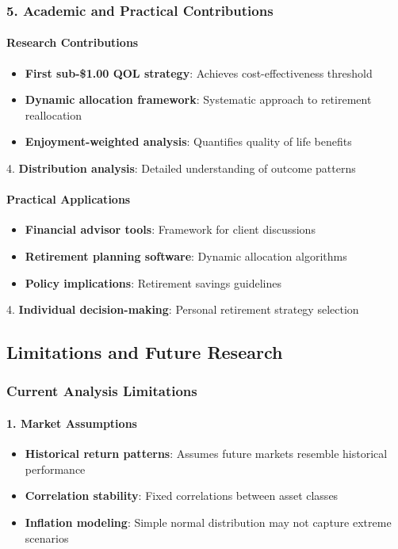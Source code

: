 \documentclass[11pt,letterpaper]{article}
\begin{document}
\subsubsection{5. Academic and Practical Contributions}

\paragraph{Research Contributions}
\begin{itemize}
\item \textbf{First sub-\$1.00 QOL strategy}: Achieves cost-effectiveness threshold
\item \textbf{Dynamic allocation framework}: Systematic approach to retirement reallocation
\item \textbf{Enjoyment-weighted analysis}: Quantifies quality of life benefits
\end{itemize}
4. \textbf{Distribution analysis}: Detailed understanding of outcome patterns


\paragraph{Practical Applications}
\begin{itemize}
\item \textbf{Financial advisor tools}: Framework for client discussions
\item \textbf{Retirement planning software}: Dynamic allocation algorithms
\item \textbf{Policy implications}: Retirement savings guidelines
\end{itemize}
4. \textbf{Individual decision-making}: Personal retirement strategy selection




\subsection{Limitations and Future Research}

\subsubsection{Current Analysis Limitations}

\paragraph{1. Market Assumptions}
\begin{itemize}
\item \textbf{Historical return patterns}: Assumes future markets resemble historical performance
\item \textbf{Correlation stability}: Fixed correlations between asset classes
\item \textbf{Inflation modeling}: Simple normal distribution may not capture extreme scenarios
\end{itemize}
\end{document}
